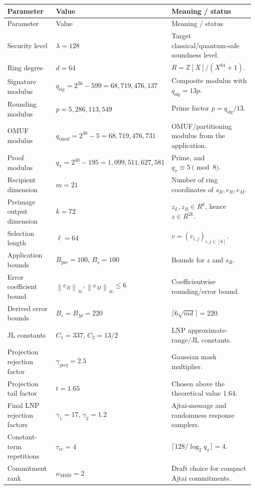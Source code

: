 \documentclass[11pt,a4paper]{article}
\newcommand{\Z}{\mathbb{Z}}
\newcommand{\sigmod}{q_{\mathrm{sig}}}
\newcommand{\omufmod}{q_{\mathrm{omuf}}}
\newcommand{\proofmod}{q_{\pi}}
\newcommand{\norm}[1]{\left\lVert #1\right\rVert}
\begin{document}
\begin{longtable}{@{}p{}p{}p{}@{}}
\toprule
Parameter & Value & Meaning / status \\
\midrule
\endfirsthead
\toprule
Parameter & Value & Meaning / status \\
\midrule
\endhead
Security level & \(\lambda=128\) & Target classical/quantum-safe soundness level. \\
Ring degree & \(d=64\) & \(R=\Z[X]/(X^{64}+1)\). \\
Signature modulus & \(\sigmod=2^{36}-599=68{,}719{,}476{,}137\) & Composite modulus with \(\sigmod=13p\). \\
Rounding modulus & \(p=5{,}286{,}113{,}549\) & Prime factor \(p=\sigmod/13\). \\
OMUF modulus & \(\omufmod=2^{36}-5=68{,}719{,}476{,}731\) & OMUF/partitioning modulus from the application. \\
Proof modulus & \(\proofmod=2^{40}-195=1{,}099{,}511{,}627{,}581\) & Prime, and \(\proofmod\equiv5\pmod 8\). \\
Recipient dimension & \(m=21\) & Number of ring coordinates of \(s_R,e_R,e_M\). \\
Preimage output dimension & \(k=72\) & \(z_L,z_R\in R^k\), hence \(z\in R^{2k}\). \\
Selection length & \(\ell=64\) & \(v=(v_{i,j})_{i,j\in[8]}\). \\
Application bounds & \(B_{\mathrm{pre}}=100\), \(B_s=100\) & Bounds for \(z\) and \(s_R\). \\
Error coefficient bound & \(\norm{e_R}_\infty,\norm{e_M}_\infty\le6\) & Coefficientwise rounding/error bound. \\
Derived error bounds & \(B_r=B_M=220\) & \(\lceil6\sqrt{md}\rceil=220\). \\
JL constants & \(C_1=337\), \(C_2=13/2\) & LNP approximate-range/JL constants. \\
Projection rejection factor & \(\gamma_{\mathrm{proj}}=2.5\) & Gaussian mask multiplier. \\
Projection tail factor & \(t=1.65\) & Chosen above the theoretical value \(1.64\). \\
Final LNP rejection factors & \(\gamma_1=17\), \(\gamma_2=1.2\) & Ajtai-message and randomness response samplers. \\
Constant-term repetitions & \(\tau_{\mathrm{cc}}=4\) & \(\lceil128/\log_2\proofmod\rceil=4\). \\
Commitment rank & \(\kappa_{\mathrm{MSIS}}=2\) & Draft choice for compact Ajtai commitments. \\

\end{longtable}
\end{document}
